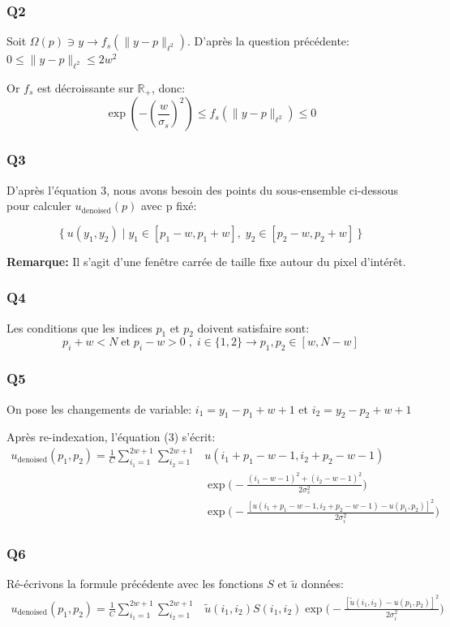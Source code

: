 \documentclass{article}
\begin{document}
\subsubsection*{Q2}
Soit $\Omega(p) \ni y \rightarrow f_s(\parallel y-p \parallel_{\ell^2})$. 
D'après la question précédente: $ 0 \leq \parallel y-p \parallel_{\ell^2} \leq 2 w^2 $

Or $f_s$ est décroissante sur $\mathbb{R}_+$, donc: $$\exp(-(\frac{w}{\sigma_s})^2) \leq f_s(\parallel y-p \parallel_{\ell^2}) \leq 0 $$

\subsubsection*{Q3} D'après l'équation 3, nous avons besoin des points du sous-ensemble ci-dessous pour calculer $u_\text{denoised}(p)$ avec p fixé: 

$$\big \{ \: u(y_1, y_2) \;|\; y_1 \in {[p_1 - w, p_1 + w]}, \; y_2 \in {[p_2 - w, p_2 + w]}\: \big \}  $$

\textbf{Remarque: } Il s'agit d'une fenêtre carrée de taille fixe autour du pixel d'intérêt.
\subsubsection*{Q4}
Les conditions que les indices $p_1$ et $p_2$ doivent satisfaire sont:
 $$p_i + w < N \;\text{et}\; p_i - w > 0 \;,\; i \in \{1, 2\} \rightarrow p_1, p_2 \in {[w, N-w]}$$
\subsubsection*{Q5}
On pose les changements de variable: $i_1 = y_1 - p_1 + w + 1$ et $i_2 = y_2 - p_2 + w + 1$

Après re-indexation, l'équation (3) s'écrit:
\begin{equation*}\begin{split}
u_\text{denoised}(p_1, p_2) = \frac{1}{C} \displaystyle\sum_{i_1 = 1}^{2w + 1}
\displaystyle\sum_{i_2 = 1}^{2w + 1} & u(i_1+p_1 - w - 1, i_2 + p_2 - w - 1) \\
& \exp{ \big ( - \frac{(i_1 - w - 1)^2 + (i_2 -w -1)^2 }{2\sigma_s^2} \big )} \\
& \exp{ \big ( - \frac{[u(i_1 + p_1 - w - 1, i_2 + p_2 - w - 1) - u(p_1, p_2)]^2}{2\sigma_i^2} \big )}
\end{split}\end{equation*}

\subsubsection*{Q6}
Ré-écrivons la formule précédente avec les fonctions $S$ et $\tilde{u}$ données:
\begin{equation*}\begin{split}
u_\text{denoised}(p_1, p_2) = \frac{1}{C} \displaystyle\sum_{i_1 = 1}^{2w + 1}
\displaystyle\sum_{i_2 = 1}^{2w + 1} & \tilde{u}(i_1, i_2) S(i_1,i_2) \exp{ \big ( - \frac{[\tilde{u}(i_1, i_2) - u(p_1, p_2)]^2}{2\sigma_i^2} \big )}
\end{split}\end{equation*}
\end{document}
